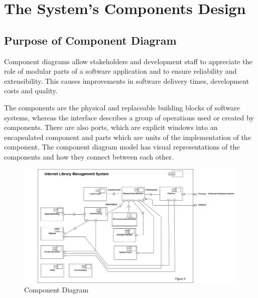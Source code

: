 \section{The System's Components Design}
\subsection{Purpose of Component Diagram}

Component diagrams allow stakeholders and development staff to appreciate the role of modular parts of a software application and to ensure reliability and extensibility. This causes improvements in software delivery times, development costs and quality\cite{felicicomp}.

The components are the physical and replaceable building blocks of software systems, whereas the interface describes a group of operations used or created by components\cite{microsoftcomp}. There are also ports, which are explicit windows into an encapsulated component and parts which are units of the implementation of the component. The component diagram model has visual representations of the components and how they connect between each other\cite{bellcomp}.

\begin{figure}[H]
    \centering
    \includegraphics[width=\linewidth]{image/component.png}
    \caption{Component Diagram}
    \label{fig:component}
\end{figure}

